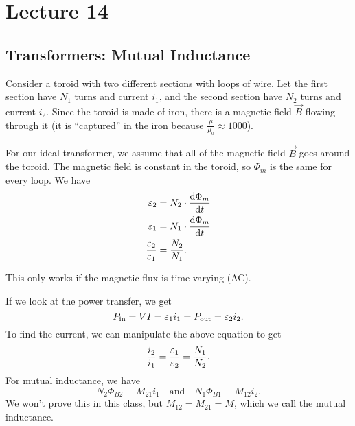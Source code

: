 \documentclass[class=article, crop=false]{standalone}
\begin{document}
  \section{Lecture 14}
  \subsection{Transformers: Mutual Inductance}
  Consider a toroid with two different sections with loops of wire. Let the first section have $N_1$ turns and current $i_1$, and the second section have $N_2$ turns and current $i_2$. Since the toroid is made of iron, there is a magnetic field $\vec{B}$ flowing through it (it is ``captured'' in the iron because $\frac{\mu}{\mu_0} \approx 1000$). \par
  For our ideal transformer, we assume that all of the magnetic field $\vec{B}$ goes around the toroid. The magnetic field is constant in the toroid, so $\Phi_m$ is the same for every loop. We have
  \begin{align*}
    \varepsilon_2 &= N_2\cdot \frac{\mathrm{d}\Phi_m}{\mathrm{d}t} \\
    \varepsilon_1 &= N_1\cdot \frac{\mathrm{d}\Phi_m}{\mathrm{d}t} \\
    \frac{\varepsilon_2}{\varepsilon_1} &= \frac{N_2}{N_1}.
  \end{align*}
  \begin{note}{}
    This only works if the magnetic flux is time-varying (AC).
  \end{note}
  If we look at the power transfer, we get
  \[
    P_\text{in} = VI = \varepsilon_1i_1 = P_\text{out} = \varepsilon_2i_2.
  \]
  To find the current, we can manipulate the above equation to get
  \[
    \frac{i_2}{i_1} = \frac{\varepsilon_1}{\varepsilon_2} = \frac{N_1}{N_2}.
  \]
  For mutual inductance, we have
  \[
    N_2\Phi_{B 2} \equiv M_{21}i_1 \quad\text{and}\quad N_1\Phi_{B 1} \equiv M_{12}i_2.
  \]
  We won't prove this in this class, but $M_{12} = M_{21} = M$, which we call the mutual inductance.
\end{document}
